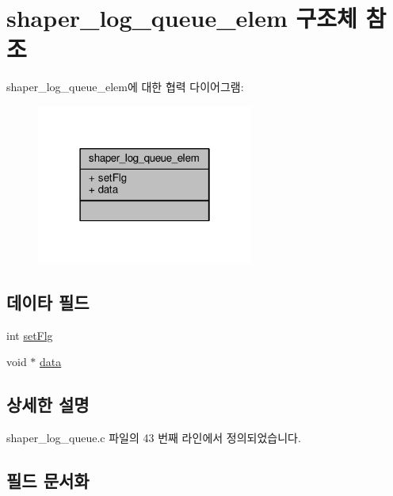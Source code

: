 \hypertarget{structshaper__log__queue__elem}{}\section{shaper\+\_\+log\+\_\+queue\+\_\+elem 구조체 참조}
\label{structshaper__log__queue__elem}


shaper\+\_\+log\+\_\+queue\+\_\+elem에 대한 협력 다이어그램\+:
\nopagebreak
\begin{figure}[H]
\begin{center}
\leavevmode
\includegraphics[width=202pt]{structshaper__log__queue__elem__coll__graph}
\end{center}
\end{figure}
\subsection*{데이타 필드}
\begin{DoxyCompactItemize}
\item 
int \hyperlink{structshaper__log__queue__elem_aa457306deb1979d52675b298626b010b}{set\+Flg}
\item 
void $\ast$ \hyperlink{structshaper__log__queue__elem_a735984d41155bc1032e09bece8f8d66d}{data}
\end{DoxyCompactItemize}


\subsection{상세한 설명}


shaper\+\_\+log\+\_\+queue.\+c 파일의 43 번째 라인에서 정의되었습니다.



\subsection{필드 문서화}
